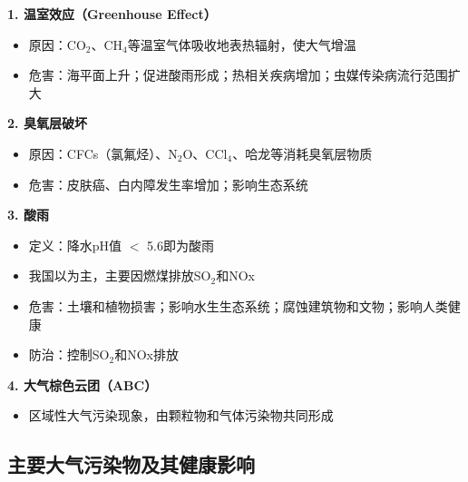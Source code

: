 \documentclass[10pt,a4paper,oneside]{ctexbook}
\begin{document}
\begin{keybox}
\textbf{1. 温室效应（Greenhouse Effect）}
\begin{itemize}[leftmargin=*]
    \item 原因：CO$_2$、CH$_4$等温室气体吸收地表热辐射，使大气增温
    \item 危害：海平面上升；促进酸雨形成；热相关疾病增加；虫媒传染病流行范围扩大
\end{itemize}

\textbf{2. 臭氧层破坏}
\begin{itemize}[leftmargin=*]
    \item 原因：CFCs（氯氟烃）、N$_2$O、CCl$_4$、哈龙等消耗臭氧层物质
    \item 危害：皮肤癌、白内障发生率增加；影响生态系统
\end{itemize}

\textbf{3. 酸雨}
\begin{itemize}[leftmargin=*]
    \item 定义：降水pH值 $<$ 5.6即为酸雨
    \item 我国以为主，主要因燃煤排放SO$_2$和NOx
    \item 危害：土壤和植物损害；影响水生生态系统；腐蚀建筑物和文物；影响人类健康
    \item 防治：控制SO$_2$和NOx排放
\end{itemize}

\textbf{4. 大气棕色云团（ABC）}
\begin{itemize}[leftmargin=*]
    \item 区域性大气污染现象，由颗粒物和气体污染物共同形成
\end{itemize}
\end{keybox}

\subsection{主要大气污染物及其健康影响}
\end{document}

